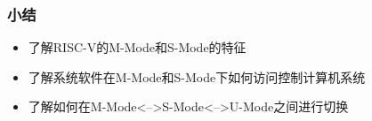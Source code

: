 %
%    
\begin{frame}
    \frametitle{小结}
    \begin{itemize}
        \item 了解RISC-V的M-Mode和S-Mode的特征
        \item 了解系统软件在M-Mode和S-Mode下如何访问控制计算机系统
        \item 了解如何在M-Mode<-->S-Mode<-->U-Mode之间进行切换
    \end{itemize}
\end{frame}

